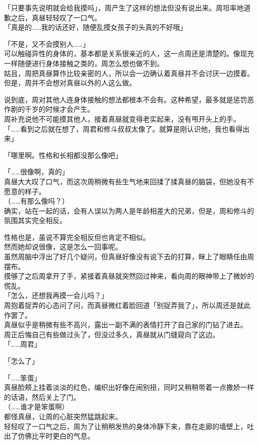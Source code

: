 「只要事先说明就会给我摸吗」，周产生了这样的想法但没有说出来。周坦率地道歉之后，真昼轻轻叹了一口气。\\

「真是的……我的话还好，随便乱摸女孩子的头真的不好哦」

「不是，又不会摸别人……」\\

可以触碰异性的身体的，基本都是关系很亲近的人，这一点周还是清楚的。像现充一样随便进行身体接触之类的，周怎么想也做不到。\\

姑且，周把真昼算作比较亲密的人，所以会一边确认着真昼并不会讨厌一边摸着。但是，周并不会想对真昼以外的人这么做。

说到底，周对其他人连身体接触的想法都根本不会有。这种希望，最多就是惩罚恶作剧的千岁的时候才会产生。\\

周补充说他不可能摸其他人，接着真昼就变得老实起来，没有甩开头上的手。\\

「……看到之后就在想了，周君和修斗叔叔太像了。就算是刚认识他，我也看得出来」

「哪里啊。性格和长相都没那么像吧」

「……很像啊，真的」\\

真昼大大叹了口气，而这次周稍微有些生气地来回揉了揉真昼的脑袋，但她没有不愿意的样子。\\

（……有那么像吗？）\\

确实，站在一起的话，会有人误以为两人是年龄相差大的兄弟，但是，周和修斗的氛围其实完全相反。

性格也是，虽说不算完全相反但也肯定不相似。\\

然而她却说很像，这是怎么一回事呢。\\

虽然周脑中浮出了好几个疑问，但真昼好像没有说下去的打算，眯上了眼睛任由周摆布。\\

摸够了之后周拿开了手，紧接着真昼就突然回过神来，看向周的眼神带上了微妙的慌乱。\\

「怎么，还想我再摸一会儿吗？」\\

周抱着捉弄的心态问了问，而真昼微红着脸回道「别捉弄我了」，所以周还是就此作罢了。\\

真昼似乎是稍微有些不高兴，露出一副不满的表情打开了自己家的门钻了进去。\\

周正后悔自己有些做过头了，但没过多久，真昼就从门缝窥向了这边。\\

「……周君」

「怎么了」

「……笨蛋」\\

真昼脸颊上挂着淡淡的红色，编织出好像在闹别扭，同时又稍稍带着一点撒娇一样的话语，然后关上了门。\\

（……谁才是笨蛋啊）\\

都怪真昼，让周的心脏突然猛跳起来。\\

轻轻叹了一口气之后，周为了让稍稍发热的身体冷静下来，靠在走廊的墙壁上，吐出了仿佛比平时更白的气息。
